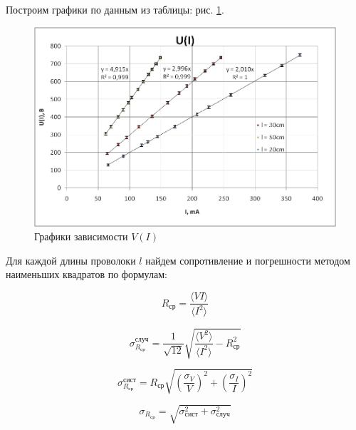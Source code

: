 \documentclass[a4paper, 12pt]{article}
\begin{document}
\newpage

Построим графики по данным из таблицы: рис. \ref{graph}.
\begin{figure}[h!]
	\centering
	\includegraphics[scale = 0.55]{111_graph}
	\caption{Графики зависимости $V(I)$}
	\label{graph}
\end{figure}

Для каждой длины проволоки $l$ найдем  сопротивление и погрешности методом наименьших квадратов по формулам:

\begin{equation}
	R_\text{ср} = \frac{\langle VI\rangle}{\langle I^2 \rangle}
\end{equation}


\begin{minipage}{0.45\textwidth}
	\centering
	\begin{equation}
		\sigma_{R_\text{ср}}^{\text{случ}} = \frac{1}{\sqrt{12}}\sqrt{\frac{\langle V^2 \rangle}{\langle I^2 \rangle} - R_\text{ср}^2}
	\end{equation}
\end{minipage}
\begin{minipage}{0.45\textwidth}
	\centering
	
	\begin{equation}
		\sigma_{R_\text{ср}}^{\text{сист}} = R_\text{ср}\sqrt{\left(\frac{\sigma_V}{V} \right)^2 + \left(\frac{\sigma_I}{I} \right)^2}
	\end{equation}
\end{minipage}

\begin{equation}
	\sigma_{R_\text{ср}} = \sqrt{\sigma_{\text{сист}}^2 + \sigma_{\text{случ}}^2}
\end{equation}
\end{document}
